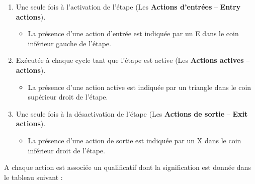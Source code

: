 \begin{enumerate}
    \item Une seule fois à l'activation de l'étape (Les \textbf{Actions d'entrées} -- \textbf{Entry actions}).
    \begin{itemize}
        \item La présence d'une action d'entrée est indiquée par un E dans le coin inférieur gauche de l'étape.
    \end{itemize}
    \item Exécutée à chaque cycle tant que l'étape est active (Les \textbf{Actions actives} -- \textbf{actions}).
    \begin{itemize}
        \item La présence d'une action active est indiquée par un triangle dans le coin supérieur droit de l'étape.
    \end{itemize}
    \item Une seule fois à la désactivation de l'étape (Les \textbf{Actions de sortie} -- \textbf{Exit actions}).
    \begin{itemize}
        \item La présence d'une action de sortie est indiquée par un X dans le coin inférieur droit de l'étape.
    \end{itemize}
\end{enumerate}

A chaque action est associée un qualificatif dont la signification est donnée dans le tableau suivant : 

